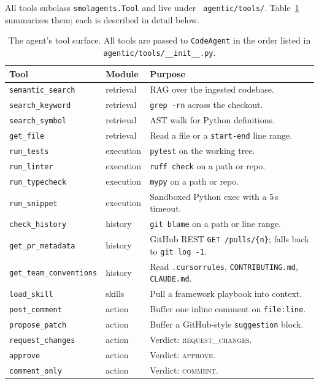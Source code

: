 \documentclass[11pt,a4paper]{article}
\newcommand{\code}[1]{\texttt{\small #1}}
\renewcommand{\path}[1]{\texttt{\small\color{mute} #1}}
\begin{document}
All tools subclass \code{smolagents.Tool} and live under
\path{agentic/tools/}. Table~\ref{tab:tools} summarizes them; each is
described in detail below.

\begin{table}[h]
\centering
\small
\begin{tabular}{@{}p{}p{}p{}@{}}
\toprule
\textbf{Tool} & \textbf{Module} & \textbf{Purpose} \\
\midrule
\code{semantic\_search}       & retrieval & RAG over the ingested codebase. \\
\code{search\_keyword}        & retrieval & \code{grep -rn} across the checkout. \\
\code{search\_symbol}         & retrieval & AST walk for Python definitions. \\
\code{get\_file}              & retrieval & Read a file or a \code{start-end} line range. \\
\code{run\_tests}             & execution & \code{pytest} on the working tree. \\
\code{run\_linter}            & execution & \code{ruff check} on a path or repo. \\
\code{run\_typecheck}         & execution & \code{mypy} on a path or repo. \\
\code{run\_snippet}           & execution & Sandboxed Python exec with a 5\,s timeout. \\
\code{check\_history}         & history   & \code{git blame} on a path or line range. \\
\code{get\_pr\_metadata}      & history   & GitHub REST \code{GET /pulls/\{n\}}; falls back to \code{git log -1}. \\
\code{get\_team\_conventions} & history   & Read \code{.cursorrules}, \code{CONTRIBUTING.md}, \code{CLAUDE.md}. \\
\code{load\_skill}            & skills    & Pull a framework playbook into context. \\
\code{post\_comment}          & action    & Buffer one inline comment on \code{file:line}. \\
\code{propose\_patch}         & action    & Buffer a GitHub-style \code{suggestion} block. \\
\code{request\_changes}       & action    & Verdict: \textsc{request\_changes}. \\
\code{approve}                & action    & Verdict: \textsc{approve}. \\
\code{comment\_only}          & action    & Verdict: \textsc{comment}. \\
\bottomrule
\end{tabular}
\caption{The agent's tool surface. All tools are passed to \code{CodeAgent}
in the order listed in \path{agentic/tools/\_\_init\_\_.py}.}
\label{tab:tools}
\end{table}
\end{document}
